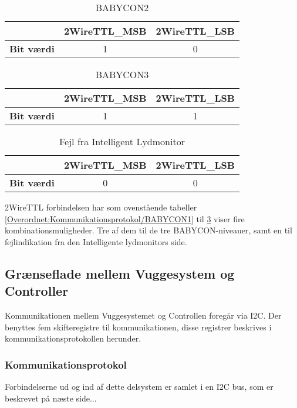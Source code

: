 \begin{table}[H]
	\caption{BABYCON2 }
	\centering
	\begin{tabular}{|l|c|c|}
		\hline 
			&\textbf{2WireTTL\_MSB} & \textbf{2WireTTL\_LSB}     \\ 
		\hline 
		\textbf{Bit værdi} &1 & 0     \\ 
		\hline
	\end{tabular} 
	\label{Overordnet:Kommunikationsprotokol/BABYCON2}
\end{table}


\begin{table}[H]
	\caption{BABYCON3 }
	\centering
	\begin{tabular}{|l|c|c|}
		\hline 
			&\textbf{2WireTTL\_MSB} & \textbf{2WireTTL\_LSB}     \\ 
		\hline 
		\textbf{Bit værdi} &1 & 1     \\ 
		\hline
	\end{tabular} 
	\label{Overordnet:Kommunikationsprotokol/BABYCON3}
\end{table}


\begin{table}[H]
	\caption{Fejl fra Intelligent Lydmonitor }
	\centering
	\begin{tabular}{|l|c|c|}
		\hline 
			&\textbf{2WireTTL\_MSB} & \textbf{2WireTTL\_LSB}     \\ 
		\hline 
		\textbf{Bit værdi} &0 & 0     \\ 
		\hline
	\end{tabular} 
	\label{Overordnet:Kommunikationsprotokol/IL_fejl}
\end{table}

2WireTTL forbindelsen har som ovenstående tabeller \ref{Overordnet:Kommunikationsprotokol/BABYCON1} til \ref{Overordnet:Kommunikationsprotokol/IL_fejl} viser fire kombinationsmuligheder. Tre af dem til de tre BABYCON-niveauer, samt en til fejlindikation fra den Intelligente lydmonitors side. 

\subsection{Grænseflade mellem Vuggesystem og Controller}
Kommunikationen mellem Vuggesystemet og Controllen foregår via I2C. Der benyttes fem skifteregistre til kommunikationen, disse registrer beskrives i kommunikationsprotokollen herunder.

\subsubsection{Kommunikationsprotokol}
Forbindelserne ud og ind af dette delsystem er samlet i en I2C bus, som er beskrevet på næste side...

